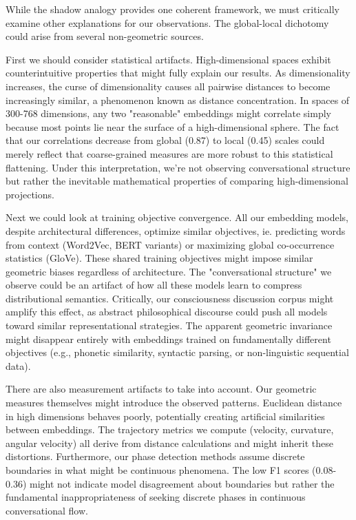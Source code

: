 \documentclass[11pt,letterpaper]{article}
\begin{document}
While the shadow analogy provides one coherent framework, we must critically examine other explanations for our observations. The global-local dichotomy could arise from several non-geometric sources.

First we should consider statistical artifacts. High-dimensional spaces exhibit counterintuitive properties that might fully explain our results. As dimensionality increases, the curse of dimensionality causes all pairwise distances to become increasingly similar, a phenomenon known as distance concentration. In spaces of 300-768 dimensions, any two "reasonable" embeddings might correlate simply because most points lie near the surface of a high-dimensional sphere. The fact that our correlations decrease from global (0.87) to local (0.45) scales could merely reflect that coarse-grained measures are more robust to this statistical flattening. Under this interpretation, we're not observing conversational structure but rather the inevitable mathematical properties of comparing high-dimensional projections.

Next we could look at training objective convergence. All our embedding models, despite architectural differences, optimize similar objectives, ie. predicting words from context (Word2Vec, BERT variants) or maximizing global co-occurrence statistics (GloVe). These shared training objectives might impose similar geometric biases regardless of architecture. The "conversational structure" we observe could be an artifact of how all these models learn to compress distributional semantics. Critically, our consciousness discussion corpus might amplify this effect, as abstract philosophical discourse could push all models toward similar representational strategies. The apparent geometric invariance might disappear entirely with embeddings trained on fundamentally different objectives (e.g., phonetic similarity, syntactic parsing, or non-linguistic sequential data).

There are also measurement artifacts to take into account. Our geometric measures themselves might introduce the observed patterns. Euclidean distance in high dimensions behaves poorly, potentially creating artificial similarities between embeddings. The trajectory metrics we compute (velocity, curvature, angular velocity) all derive from distance calculations and might inherit these distortions. Furthermore, our phase detection methods assume discrete boundaries in what might be continuous phenomena. The low F1 scores (0.08-0.36) might not indicate model disagreement about boundaries but rather the fundamental inappropriateness of seeking discrete phases in continuous conversational flow.
\end{document}
